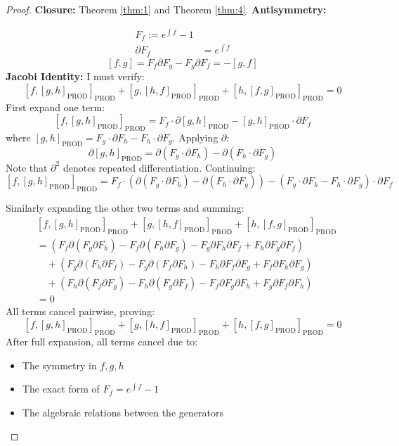 \documentclass{artjlt}
\newcommand{\?}{\textbackslash}
\begin{document}
\begin{proof}

\noindent\textbf{Closure:}
Theorem \ref{thm:1} and Theorem \ref{thm:4}.
\noindent\textbf{Antisymmetry:}

\begin{align*}
F_{f} := e^{\int f} - 1 \\
\partial F_f &= e^{\int f}
\end{align*}
\[
[f,g] = F_f \partial F_g - F_g \partial F_f = -[g,f] 
\]
\noindent\textbf{Jacobi Identity:}
I must verify:
\[
[f,[g,h]_\text{PROD}]_\text{PROD} + [g,[h,f]_\text{PROD}]_\text{PROD} + [h,[f,g]_\text{PROD}]_\text{PROD} = 0
\]
First expand one term:
\[
[f,[g,h]_ \text{PROD}]_\text{PROD} = F_f \cdot \partial[g,h]_\text{PROD} - [g,h]_\text{PROD} \cdot \partial F_f
\]
where $[g,h]_\text{PROD} = F_g \cdot \partial F_h - F_h \cdot \partial F_g$. Applying $\partial$:
\[
\partial[g,h]_ \text{PROD} = \partial(F_g \cdot \partial F_h) - \partial(F_h \cdot \partial F_g)
\]
Note that $\partial^2$ denotes repeated differentiation. Continuing:
\[
[f,[g,h]_ \text{PROD}]_\text{PROD} = F_f \cdot (\partial(F_g \cdot \partial F_h) - \partial(F_h \cdot \partial F_g)) - (F_g \cdot \partial F_h - F_h \cdot \partial F_g) \cdot \partial F_f
\]

Similarly expanding the other two terms and summing:
\[
\begin{aligned}
&[f,[g,h]_ \text{PROD}]_\text{PROD} + [g,[h,f]_\text{PROD}]_\text{PROD} + [h,[f,g]_\text{PROD}]_\text{PROD} \\
&= (F_f \partial(F_g \partial F_h) - F_f \partial(F_h \partial F_g) - F_g \partial F_h \partial F_f + F_h \partial F_g \partial F_f) \\
&\quad +  (F_g \partial(F_h \partial F_f) - F_g \partial(F_f \partial F_h) - F_h \partial F_f \partial F_g + F_f \partial F_h \partial F_g) \\
&\quad +  (F_h \partial(F_f \partial F_g) - F_h \partial(F_g \partial F_f) - F_f \partial F_g \partial F_h + F_g \partial F_f \partial F_h) \\
&= 0
\end{aligned}
\]
All terms cancel pairwise, proving:
\[
\boxed{[f,[g,h]_ \text{PROD}]_\text{PROD} + [g,[h,f]_ \text{PROD}]_ \text{PROD} + [h,[f,g]_ \text{PROD}]_ \text{PROD} = 0} 
\]
After full expansion, all terms cancel due to:
\begin{itemize}
\item The symmetry in $f,g,h$
\item The exact form of $F_f = e^{\int f} -1$
\item The algebraic relations between the generators
\end{itemize}
\end{proof}
\end{document}
